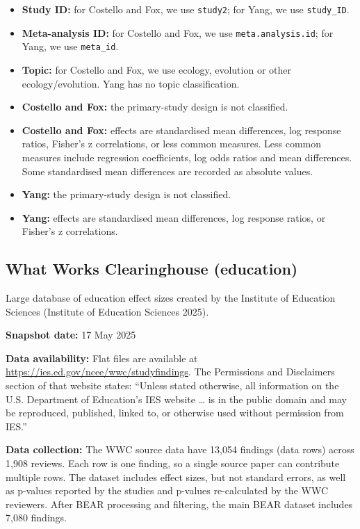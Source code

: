\documentclass[
  11pt,
]{article}
\begin{document}
\begin{itemize}
\item
  \textbf{Study ID:} for Costello and Fox, we use \texttt{study2}; for
  Yang, we use \texttt{study\_ID}.
\item
  \textbf{Meta-analysis ID:} for Costello and Fox, we use
  \texttt{meta.analysis.id}; for Yang, we use \texttt{meta\_id}.
\item
  \textbf{Topic:} for Costello and Fox, we use ecology, evolution or
  other ecology/evolution. Yang has no topic classification.
\item
  \textbf{Costello and Fox:} the primary-study design is not classified.
\item
  \textbf{Costello and Fox:} effects are standardised mean differences,
  log response ratios, Fisher's z correlations, or less common measures.
  Less common measures include regression coefficients, log odds ratios
  and mean differences. Some standardised mean differences are recorded
  as absolute values.
\item
  \textbf{Yang:} the primary-study design is not classified.
\item
  \textbf{Yang:} effects are standardised mean differences, log response
  ratios, or Fisher's z correlations.
\end{itemize}

\newpage

\subsection{What Works Clearinghouse
(education)}\label{what-works-clearinghouse-education}

Large database of education effect sizes created by the Institute of
Education Sciences (Institute of Education Sciences 2025).

\textbf{Snapshot date:} 17 May 2025

\textbf{Data availability:} Flat files are available at
\url{https://ies.ed.gov/ncee/wwc/studyfindings}. The Permissions and
Disclaimers section of that website states: ``Unless stated otherwise,
all information on the U.S. Department of Education's IES website
\ldots{} is in the public domain and may be reproduced, published,
linked to, or otherwise used without permission from IES.''

\textbf{Data collection:} The WWC source data have 13,054 findings (data
rows) across 1,908 reviews. Each row is one finding, so a single source
paper can contribute multiple rows. The dataset includes effect sizes,
but not standard errors, as well as p-values reported by the studies and
p-values re-calculated by the WWC reviewers. After BEAR processing and
filtering, the main BEAR dataset includes 7,080 findings.
\end{document}
